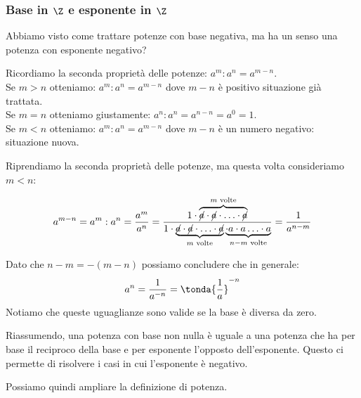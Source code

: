 % 

\subsubsection{Base in \(\Z\) e esponente in \(\Z\)}

Abbiamo visto come trattare potenze con base negativa, ma ha un senso una 
potenza con esponente negativo?

Ricordiamo la seconda proprietà delle potenze: \(a^m : a^n = a^{m-n}\). \\
Se \(m > n\) otteniamo: \(a^m : a^n = a^{m-n}\) dove \(m-n\) è 
positivo situazione già trattata.\\
Se \(m = n\) otteniamo giustamente: \(a^n : a^n = a^{n-n} = a^0 = 1\).\\
Se \(m < n\) otteniamo: \(a^m : a^n = a^{m-n}\) dove \(m-n\) è 
un numero negativo: situazione nuova.

Riprendiamo la seconda proprietà delle potenze, ma questa volta 
consideriamo \(m < n\):

\[
 a^{m-n} = a^m: a^n = \frac{a^m}{a^n}=
 \frac{1 \cdot \overbrace{\cancel{a} \cdot \cancel{a} \cdot 
       \ldots \cdot \cancel{a}}^{m \text{ volte}}}
      {1 \cdot \underbrace{\cancel{a} \cdot \cancel{a} \cdot
                           \ldots \cdot \cancel{a}}_{m \text{ volte}} 
               \underbrace{\cdot a \cdot a \ldots 
                           \cdot a}_{n-m \text{ volte}}}=
 \frac{1}{a^{n-m}}
\]

Dato che \(n-m = -(m-n)\) possiamo concludere che in generale:
\[a^n = \frac{1}{a^{-n}} = \tonda{\frac{1}{a}}^{-n}\]
Notiamo che queste uguaglianze sono valide se la base è diversa da zero.

Riassumendo, una potenza con base non nulla è uguale a una potenza che ha 
per base il reciproco della base e per esponente l'opposto dell'esponente.
Questo ci permette di risolvere i casi in cui l'esponente è negativo.

Possiamo quindi ampliare la definizione di potenza.


